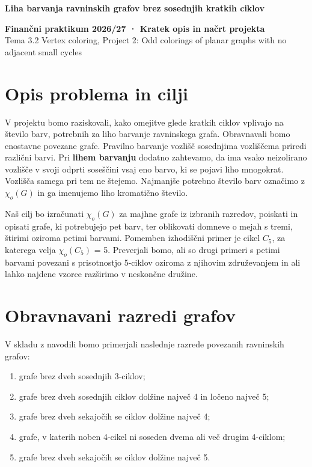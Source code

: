 \documentclass[10pt,a4paper]{article}
\begin{document}
{\Large\bfseries Liha barvanja ravninskih grafov brez sosednjih kratkih ciklov\par}
\vspace{5pt}

\textbf{Finančni praktikum 2026/27 · Kratek opis in načrt projekta}\\
Tema 3.2 Vertex coloring, Project 2: Odd colorings of planar graphs with no adjacent small cycles

\section*{Opis problema in cilji}

V projektu bomo raziskovali, kako omejitve glede kratkih ciklov vplivajo na število barv, potrebnih za liho barvanje ravninskega grafa. Obravnavali bomo enostavne povezane grafe. Pravilno barvanje vozlišč sosednjima vozliščema priredi različni barvi. Pri \textbf{lihem barvanju} dodatno zahtevamo, da ima vsako neizolirano vozlišče v svoji odprti soseščini vsaj eno barvo, ki se pojavi liho mnogokrat. Vozlišča samega pri tem ne štejemo. Najmanjše potrebno število barv označimo z \textbf{$\chi_o(G)$} in ga imenujemo liho kromatično število.

Naš cilj bo izračunati $\chi_o(G)$ za majhne grafe iz izbranih razredov, poiskati in opisati grafe, ki potrebujejo pet barv, ter oblikovati domneve o mejah s tremi, štirimi oziroma petimi barvami. Pomemben izhodiščni primer je cikel $C_5$, za katerega velja $\chi_o(C_5)$ = 5. Preverjali bomo, ali so drugi primeri s petimi barvami povezani s prisotnostjo 5-ciklov oziroma z njihovim združevanjem in ali lahko najdene vzorce razširimo v neskončne družine.

\section*{Obravnavani razredi grafov}

V skladu z navodili bomo primerjali naslednje razrede povezanih ravninskih grafov:

\begin{enumerate}
\item grafe brez dveh sosednjih 3-ciklov;
\item grafe brez dveh sosednjih ciklov dolžine največ 4 in ločeno največ 5;
\item grafe brez dveh sekajočih se ciklov dolžine največ 4;
\item grafe, v katerih noben 4-cikel ni soseden dvema ali več drugim 4-ciklom;
\item grafe brez dveh sekajočih se ciklov dolžine največ 5.
\end{enumerate}
\end{document}
